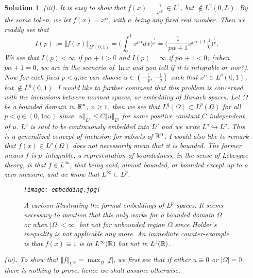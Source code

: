 \documentclass[6pt]{article}
\newtheorem{solution}{Solution}
\numberwithin{equation}{section}
\def\mathbb{\Bbb}
\begin{document}
\begin{enumerate}
\begin{solution}
(iii).  It is easy to show that $f(x)=\frac{1}{\sqrt x}\in L^1$, but $\not \in L^2(0,L)$.  By the same token, we let $f(x)=x^\alpha$, with $\alpha$ being any fixed real number.  Then we readily see that
\[I(p):=\Vert f(x)\Vert_{L^p(0,1)}=\Big(\int_0^1 x^{p\alpha}dx \Big)^\frac{1}{p}=\Big(\frac{1}{p\alpha+1}x^{p\alpha+1}\Big|_0^1\Big)^\frac{1}{p}.\]
We see that $I(p)<\infty$ if $p\alpha+1>0$ and $I(p)=\infty$ if $p\alpha+1<0$; (when $p\alpha+1=0$, we are in the scenerio of $\ln x$ and you tell if it is integrable or nor?).  Now for each fixed $p<q$,we can choose $\alpha\in(-\frac{1}{p},-\frac{1}{q})$ such that $x^\alpha \in L^p(0,1)$, but $\not \in L^q(0,1)$.  I would like to further comment that this problem is concerned with the inclusions between normed spaces, or embedding of Banach spaces.  Let $\Omega$ be a bounded domain in $\mathbb R^n$, $n\geq1$, then we see that $L^q(\Omega)\subset L^p(\Omega)$ for all $p<q\in(0,1\infty)$ since $\Vert u\Vert_{L^p}\leq C\Vert u\Vert_{L^q}$ for some positive constant $C$ independent of $u$.  $L^q$ is said to be continuously embedded into $L^p$ and we write $L^q\hookrightarrow L^p$.  This is a generalized concept of inclusion for subsets of $\mathbb R^n$.  I would also like to remark that $f(x)\in L^p(\Omega)$ does not necessarily mean that it is bounded.  The former means $f$ is $p$--integrable; a representation of boundedness, in the sense of Lebesgue theory, is that $f\in L^\infty$, that being said, almost bounded, or bounded except up to a zero measure, and we know that $L^\infty\subset L^p$.

\begin{figure}
  \centering
  \texttt{[image: embedding.jpg]}\\
  \caption{A cartoon illustrating the formal embeddings of $L^p$ spaces.  It seems necessary to mention that this only works for a bounded domain $\Omega$ or when $|\Omega|<\infty$, but not for unbounded region $\Omega$ since Holder's inequality is not applicable any more.  An immediate counter-example is that $f(x)\equiv 1$ is in $L^\infty(\mathbb R)$ but not in $L^1(\mathbb R)$.}
\end{figure}

(iv).   To show that $\Vert f\Vert_{L^\infty}=\max_{\bar \Omega}|f|$, we first see that if either $u\equiv 0$ or $|\Omega|=0$, there is nothing to prove, hence we shall assume otherwise.


\end{solution}
\end{enumerate}
\end{document}
